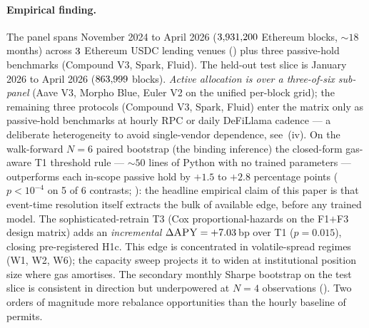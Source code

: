 \paragraph{Empirical finding.}
The panel spans November 2024 to April 2026 ($3{,}931{,}200$ Ethereum
blocks, $\sim 18$ months) across $3$ Ethereum USDC lending
venues (\ProtocolList) plus three passive-hold benchmarks (Compound
V3, Spark, Fluid).  The held-out test slice is January 2026 to April
2026 ($863{,}999$ blocks).  \emph{Active allocation is over a
three-of-six sub-panel} (Aave V3, Morpho Blue, Euler V2 on the
unified per-block grid); the remaining three protocols (Compound V3,
Spark, Fluid) enter the matrix only as passive-hold benchmarks at
hourly RPC or daily DeFiLlama cadence --- a deliberate
heterogeneity to avoid single-vendor dependence, see
\,(iv).  On the walk-forward $N\!=\!6$ paired
bootstrap (the binding inference) the closed-form gas-aware T1
threshold rule --- $\sim 50$ lines of Python with no trained
parameters --- outperforms each in-scope passive hold by $+1.5$ to
$+2.8$ percentage points ($p<10^{-4}$ on 5 of 6 contrasts;
): the headline empirical claim of this paper is
that event-time resolution itself extracts the bulk of available
edge, before any trained model.  The sophisticated-retrain T3
(Cox proportional-hazards on the F1$+$F3 design matrix) adds an
\emph{incremental} $\Delta\textsc{APY} = +7.03$\,bp over T1
($p = 0.015$), closing pre-registered H1c.  This edge is
concentrated in volatile-spread regimes (W1, W2, W6); the capacity
sweep projects it to widen at institutional position size where
gas amortises.  The secondary monthly Sharpe bootstrap on the test
slice is consistent in direction but underpowered at $N=4$
observations ().  Two orders of magnitude
more rebalance opportunities than the hourly baseline of
\cite{solovev2026vault} permits.

